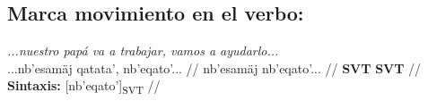 \documentclass{article}%
\begin{document}
\subsection{Marca movimiento en el verbo:}%
\label{subsec:Marcamovimientoenelverbo}%

%
\par\medskip%
\ex
\textit{...nuestro papá va a trabajar, vamos a ayudarlo...} \\
\begingl
\gla ...nb'esamäj qatata', nb'eqato'... //
\glb nb'esamäj nb'eqato'... //
\glc \textbf{SVT} \textbf{SVT} //
\glft \textbf{Sintaxis:} [nb'eqato']\textsubscript{SVT} //
\endgl
\xe
%
\medskip

%
\end{document}
